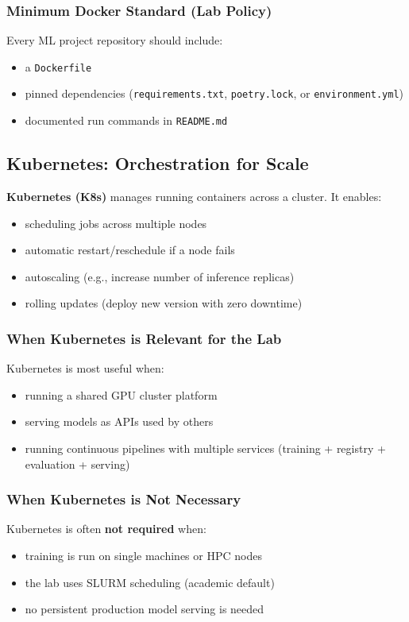 \documentclass[11pt]{article}
\begin{document}
\subsubsection{Minimum Docker Standard (Lab Policy)}
Every ML project repository should include:
\begin{itemize}
  \item a \texttt{Dockerfile}
  \item pinned dependencies (\texttt{requirements.txt}, \texttt{poetry.lock}, or \texttt{environment.yml})
  \item documented run commands in \texttt{README.md}
\end{itemize}

\subsection{Kubernetes: Orchestration for Scale}
\textbf{Kubernetes (K8s)} manages running containers across a cluster.
It enables:
\begin{itemize}
  \item scheduling jobs across multiple nodes
  \item automatic restart/reschedule if a node fails
  \item autoscaling (e.g., increase number of inference replicas)
  \item rolling updates (deploy new version with zero downtime)
\end{itemize}

\subsubsection{When Kubernetes is Relevant for the Lab}
Kubernetes is most useful when:
\begin{itemize}
  \item running a shared GPU cluster platform
  \item serving models as APIs used by others
  \item running continuous pipelines with multiple services (training + registry + evaluation + serving)
\end{itemize}

\subsubsection{When Kubernetes is Not Necessary}
Kubernetes is often \textbf{not required} when:
\begin{itemize}
  \item training is run on single machines or HPC nodes
  \item the lab uses SLURM scheduling (academic default)
  \item no persistent production model serving is needed
\end{itemize}
\end{document}
